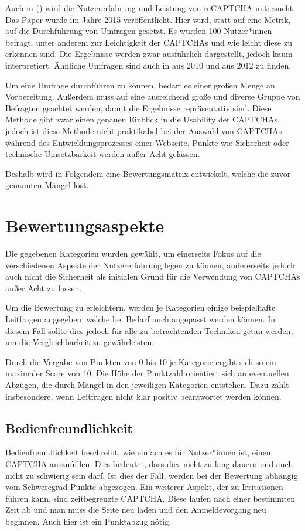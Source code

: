 Auch in  (\cite{Beheshti}) wird die Nutzererfahrung und Leistung von reCAPTCHA untersucht.
Das Paper wurde im Jahre 2015 veröffentlicht.
Hier wird, statt auf eine Metrik, auf die Durchführung von Umfragen gesetzt.
Es wurden 100 Nutzer*innen befragt, unter anderem zur Leichtigkeit der CAPTCHAs und wie leicht diese zu erkennen sind.
Die Ergebnisse werden zwar ausführlich dargestellt, jedoch kaum interpretiert.
\cite{Beheshti}
Ähnliche Umfragen sind auch in \cite{madathil2010investigation} aus 2010 und \cite{wismer} aus 2012 zu finden.

Um eine Umfrage durchführen zu können, bedarf es einer großen Menge an Vorbereitung.
Außerdem muss auf eine ausreichend große und diverse Gruppe von Befragten geachtet werden, damit die Ergebnisse repräsentativ sind.
Diese Methode gibt zwar einen genauen Einblick in die Usability der CAPTCHAs, 
jedoch ist diese Methode nicht praktikabel bei der Auswahl von CAPTCHAs während des Entwicklungsprozesses einer Webseite.
Punkte wie Sicherheit oder technische Umsetzbarkeit werden außer Acht gelassen.

Deshalb wird in Folgendem eine Bewertungsmatrix entwickelt, welche die zuvor genannten Mängel löst.

\section{Bewertungsaspekte}
\label{ch:matrix:aspekte}
Die gegebenen Kategorien wurden gewählt, um einerseits Fokus auf die verschiedenen Aspekte der Nutzererfahrung legen zu können,
andererseits jedoch auch nicht die Sicherheit als initialen Grund für die Verwendung von CAPTCHAs außer Acht zu lassen.

Um die Bewertung zu erleichtern, werden je Kategorien einige beispielhafte Leitfragen angegeben, welche bei Bedarf auch angepasst werden können.
In diesem Fall sollte dies jedoch für alle zu betrachtenden Techniken getan werden, um die Vergleichbarkeit zu gewährleisten.

Durch die Vergabe von Punkten von 0 bis 10 je Kategorie ergibt sich so ein maximaler Score von 10.
Die Höhe der Punktzahl orientiert sich an eventuellen Abzügen, die durch Mängel in den jeweiligen Kategorien entstehen.
Dazu zählt insbesondere, wenn Leitfragen nicht klar positiv beantwortet werden können.

\subsection{Bedienfreundlichkeit}
\label{ch:matrix:aspekte:Bedienfreundlichkeit}
Bedienfreundlichkeit beschreibt, wie einfach es für Nutzer*innen ist, einen CAPTCHA auszufüllen.
Dies bedeutet, dass dies nicht zu lang dauern und auch nicht zu schwierig sein darf. 
Ist dies der Fall, werden bei der Bewertung abhängig vom Schweregrad Punkte abgezogen. %
Ein weiterer Aspekt, der zu Irritationen führen kann, sind zeitbegrenzte CAPTCHA. 
Diese laufen nach einer bestimmten Zeit ab und man muss die Seite neu laden und den Anmeldevorgang neu beginnen.
Auch hier ist ein Punktabzug nötig.

